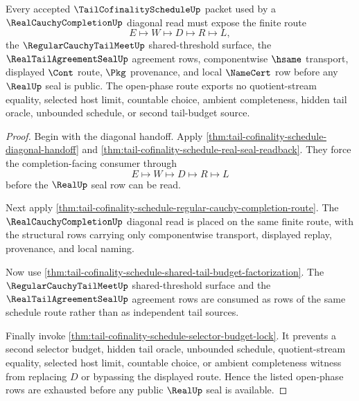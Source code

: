 \begin{theorem}
\label{thm:tail-cofinality-schedule-open-phase-row-exhaustion}
Every accepted $\TailCofinalityScheduleUp$ packet used by a $\RealCauchyCompletionUp$ diagonal read must expose the finite route
$$
E \longmapsto W \longmapsto D \longmapsto R \longmapsto L,
$$
the $\RegularCauchyTailMeetUp$ shared-threshold surface, the $\RealTailAgreementSealUp$ agreement rows, componentwise $\hsame$ transport, displayed $\Cont$ route, $\Pkg$ provenance, and local $\NameCert$ row before any $\RealUp$ seal is public. The open-phase route exports no quotient-stream equality, selected host limit, countable choice, ambient completeness, hidden tail oracle, unbounded schedule, or second tail-budget source.
\end{theorem}
\begin{proof}
Begin with the diagonal handoff. Apply \autoref{thm:tail-cofinality-schedule-diagonal-handoff} and \autoref{thm:tail-cofinality-schedule-real-seal-readback}. They force the completion-facing consumer through
$$
E \longmapsto W \longmapsto D \longmapsto R \longmapsto L
$$
before the $\RealUp$ seal row can be read.

Next apply \autoref{thm:tail-cofinality-schedule-regular-cauchy-completion-route}. The $\RealCauchyCompletionUp$ diagonal read is placed on the same finite route, with the structural rows carrying only componentwise transport, displayed replay, provenance, and local naming.

Now use \autoref{thm:tail-cofinality-schedule-shared-tail-budget-factorization}. The $\RegularCauchyTailMeetUp$ shared-threshold surface and the $\RealTailAgreementSealUp$ agreement rows are consumed as rows of the same schedule route rather than as independent tail sources.

Finally invoke \autoref{thm:tail-cofinality-schedule-selector-budget-lock}. It prevents a second selector budget, hidden tail oracle, unbounded schedule, quotient-stream equality, selected host limit, countable choice, or ambient completeness witness from replacing $D$ or bypassing the displayed route. Hence the listed open-phase rows are exhausted before any public $\RealUp$ seal is available.
\end{proof}

